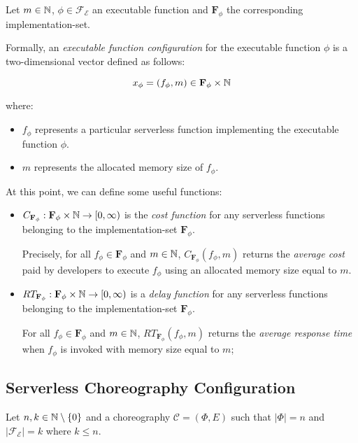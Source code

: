 Let $m \in \mathbb{N}$, $\phi \in \mathscr{F_E}$ an executable function and $\textbf{F}_{\phi}$ the corresponding implementation-set.

Formally, an \textit{executable function configuration} for the executable function $\phi$ is a two-dimensional vector defined as follows:

\begin{equation}
x_{\phi} = (f_{\phi},m) \in \textbf{F}_{\phi} \times \mathbb{N}
\end{equation}

where:

\begin{itemize}
	\item $f_{\phi}$ represents a particular serverless function implementing the executable function $\phi$.
	\item $m$ represents the allocated memory size of $f_{\phi}$.
\end{itemize}

At this point, we can define some useful functions:

\begin{itemize}	
	\item $C_{\textbf{F}_{\phi}} : \textbf{F}_{\phi} \times \mathbb{N} \to \left[ 0, \infty \right)$ is the \textit{cost function} for any serverless functions belonging to the implementation-set $\textbf{F}_{\phi}$.
	
	Precisely, for all $f_{\phi} \in \textbf{F}_{\phi}$ and $m \in \mathbb{N}$, $C_{\textbf{F}_{\phi}}(f_{\phi}, m)$ returns the \textit{average cost} paid by developers to execute $f_{\phi}$ using an allocated memory size equal to $m$.
	
	
	\item $RT_{\textbf{F}_{\phi}} : \textbf{F}_{\phi} \times \mathbb{N} \to \left[ 0, \infty \right)$ is a \textit{delay function} for any serverless functions belonging to the implementation-set $\textbf{F}_{\phi}$.
	
	For all $f_{\phi} \in \textbf{F}_{\phi}$ and $m \in \mathbb{N}$, $RT_{\textbf{F}_{\phi}}(f_{\phi}, m)$ returns the \textit{average response time} when $f_{\phi}$ is invoked with memory size equal to $m$;
\end{itemize}




\subsection{Serverless Choreography Configuration}

Let $n,k \in \mathbb{N} \setminus \left\lbrace 0 \right\rbrace$ and a choreography $\mathcal{C} = (\Phi,E)$ such that $|\Phi| = n$ and $|\mathscr{F_E}| = k$ where $k \leq n$.

